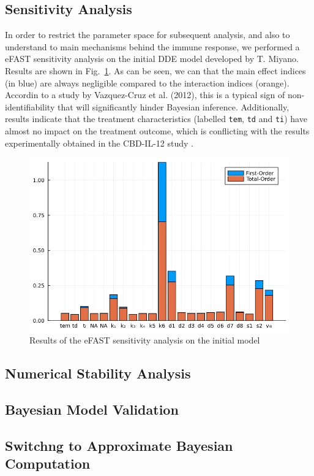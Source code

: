 \documentclass[11pt]{article}
\begin{document}
\subsection{Sensitivity Analysis}
In order to restrict the parameter space for subsequent analysis, and also to understand to main mechanisms behind the immune response, we performed a eFAST sensitivity analysis on the initial DDE model developed by T. Miyano. Results are shown in Fig.~\ref{fig:efast}. As can be seen, we can that the main effect indices (in blue) are always negligible compared to the interaction indices (orange). Accordin to a study by Vazquez-Cruz et al. (2012), this is a typical sign of non-identifiability \cite{tomgro} that will significantly hinder Bayesian inference. Additionally, results indicate that the treatment characteristics (labelled \verb+tem+, \verb+td+ and \verb+ti+) have almost no impact on the treatment outcome, which is conflicting with the results experimentally obtained in the CBD-IL-12 study \cite{cbdil12}. 

\begin{figure}[!ht]
    \centering\includegraphics[scale=0.4]{Images/batch2/eFAST_old.png}
    \caption{Results of the eFAST sensitivity analysis on the initial model}
    \label{fig:efast}
\end{figure}
\subsection{Numerical Stability Analysis}

\subsection{Bayesian Model Validation}

\subsection{Switchng to Approximate Bayesian Computation}

\newpage 
\clearpage
\newpage



\end{document}

